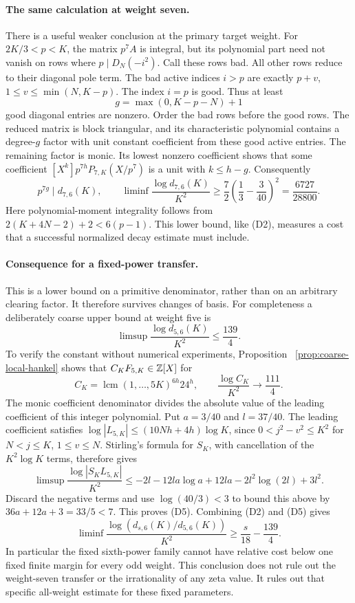 \paragraph{The same calculation at weight seven.}
There is a useful weaker conclusion at the primary target weight.
For $2K/3<p<K$, the matrix $p^7A$ is integral, but its polynomial
part need not vanish on rows where $p\mid D_N(-i^2)$.
Call these rows bad. All other rows reduce to their diagonal pole
term. The bad active indices $i>p$ are exactly
$p+v$, $1\le v\le\min(N,K-p)$. The index $i=p$ is good.
Thus at least
\[
 g=\max(0,K-p-N)+1
\]
good diagonal entries are nonzero. Order the bad rows before the
good rows. The reduced matrix is block triangular, and its
characteristic polynomial contains a degree-$g$ factor with unit
constant coefficient from these good active entries. The remaining
factor is monic. Its lowest nonzero coefficient shows that some
coefficient $[X^k]p^{7h}P_{7,K}(X/p^7)$ is a unit with $k\le h-g$.
Consequently
\[
 p^{7g}\mid d_{7,6}(K),\qquad
 \liminf\frac{\log d_{7,6}(K)}{K^2}
 \ge\frac72\left(\frac13-\frac3{40}\right)^2
 =\frac{6727}{28800}.                                  \tag{D7}
\]
Here polynomial-moment integrality follows from
$2(K+4N-2)+2<6(p-1)$. This lower bound, like (D2), measures a
cost that a successful normalized decay estimate must include.

\paragraph{Consequence for a fixed-power transfer.}
This is a lower bound on a primitive denominator, rather than on
an arbitrary clearing factor. It therefore survives changes of basis.
For completeness a deliberately coarse upper bound at weight five is
\[
 \limsup\frac{\log d_{5,6}(K)}{K^2}\le\frac{139}{4}.
                                                               \tag{D5}
\]
To verify the constant without numerical experiments, Proposition~
\ref{prop:coarse-local-hankel} shows that
$C_KF_{5,K}\in\mathbb Z[X]$ for
\[
 C_K=\operatorname{lcm}(1,\ldots,5K)^{6h}24^h,
 \qquad \frac{\log C_K}{K^2}\longrightarrow\frac{111}{4}.
\]
The monic coefficient denominator divides the absolute value of the
leading coefficient of this integer polynomial. Put $a=3/40$ and
$l=37/40$. The leading coefficient satisfies
$\log|L_{5,K}|\le(10Nh+4h)\log K$, since
$0<j^2-v^2\le K^2$ for $N<j\le K$, $1\le v\le N$.
Stirling's formula for $S_K$, with cancellation of the
$K^2\log K$ terms, therefore gives
\[
 \limsup\frac{\log|S_KL_{5,K}|}{K^2}
 \le-2l-12la\log a+12la-2l^2\log(2l)+3l^2.
\]
Discard the negative terms and use $\log(40/3)<3$ to bound this above by
$36a+12a+3=33/5<7$. This proves (D5).
Combining (D2) and (D5) gives
\[
 \liminf\frac{\log(d_{s,6}(K)/d_{5,6}(K))}{K^2}
 \ge\frac{s}{18}-\frac{139}{4}.                         \tag{D6}
\]
In particular the fixed sixth-power family cannot have relative cost
below one fixed finite margin for every odd weight. This conclusion
does not rule out the weight-seven transfer or the irrationality of
any zeta value. It rules out that specific all-weight estimate for
these fixed parameters.


